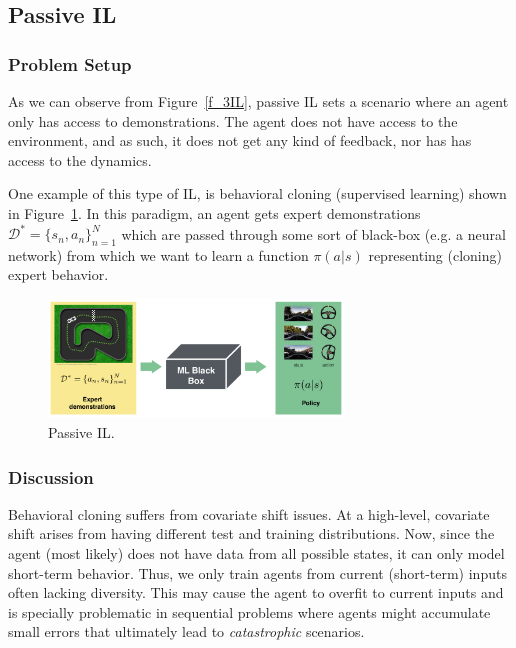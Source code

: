 \documentclass[11pt]{article}
\begin{document}
\subsection{Passive IL}

\subsubsection{Problem Setup}

As we can observe from Figure~\ref{f_3IL}, passive IL sets a scenario where an agent only has access to demonstrations. The agent does not have access to the environment, and as such, it does not get any kind of feedback, nor has has access to the dynamics. 

One example of this type of IL, is behavioral cloning (supervised learning) shown in Figure~\ref{fig:passive}. In this paradigm, an agent gets expert demonstrations $\mathcal{D}^\ast = \{s_n, a_n\}_{n=1}^N$ which are passed through some sort of black-box (e.g. a neural network) from which we want to learn a function $\pi(a |s)$ representing (cloning) expert behavior.
\begin{figure}[H]
    \centering
    \includegraphics[width=0.7\textwidth]{images/passive_il.png}
    \caption{Passive IL.}
    \label{fig:passive}
\end{figure}

\subsubsection{Discussion}

Behavioral cloning suffers from covariate shift issues. At a high-level, covariate shift arises from having different test and training distributions. Now, since the agent (most likely) does not have data from all possible states, it can only model short-term behavior. Thus, we only train agents from current (short-term) inputs often lacking diversity. This may cause the agent to overfit to current inputs and is specially problematic in sequential problems where agents might accumulate small errors that ultimately lead to \textit{catastrophic} scenarios. 
\end{document}
